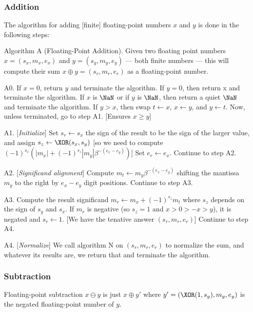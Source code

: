 \subsubsection{Addition}

The algorithm for adding [finite] floating-point numbers $x$ and $y$ is
done in the following steps:

\algbegin Algorithm A (Floating-Point Addition). \label{alg:float-addition}Given two floating
point numbers $x=(s_{x},m_{x},e_{x})$ and $y=(s_{y},m_{y},e_{y})$ ---
both finite numbers --- this
will compute their sum $x\oplus y = (s_{r}, m_{r}, e_{r})$ as a
floating-point number.

\algstep A0.
If $x = 0$, return $y$ and terminate the algorithm.
If $y=0$, then return x and terminate the algorithm.
If $x$ is $\NaN$ or if $y$ is $\NaN$, then return a quiet $\NaN$
and terminate the algorithm.
If $y > x$, then swap $t\gets x$, $x\gets y$, and $y\gets t$.
Now, unless terminated, go to step A1. [Ensures $x\geq y$]

\algstep A1. [{\it Initialize\/}]
Set $s_{r}\gets s_{x}$ the sign of the
result to be the sign of the larger value, and assign $s_{z} \gets \XOR(s_{x},s_{y})$
[so we need to compute $(-1)^{s_{x}}(|m_{x}| + (-1)^{s_{z}}|m_{y}|\beta^{-(e_{x}-e_{y})})$]
Set $e_{r}\gets e_{x}$. Continue to step A2.

\algstep A2. [{\it Significand alignment\/}] Compute $m_{t}\gets m_{y}\beta^{-(e_{x}-e_{y})}$
shifting the mantissa $m_{y}$ to the right by $e_{x}-e_{y}$ digit
positions. Continue to step A3.

\algstep A3. Compute the result significand $m_{r}\gets m_{x} + (-1)^{s_{z}}m_{t}$
where $s_{z}$ depends on the sign of $s_{y}$ and $s_{x}$. If $m_{r}$
is negative (so $s_{z}=1$ and $x>0>-x>y$), it is negated and $s_{r}\gets 1$.
[We have the tenative answer $(s_{r}, m_{r}, e_{r})$] Continue to step A4.

\algstep A4. [{\it Normalize\/}] We call algorithm N on $(s_{r}, m_{r}, e_{r})$
to normalize the sum, and whatever its results are, we return that and
terminate the algorithm.\quad\slug


\subsubsection{Subtraction}

\begin{rmk}[Subtraction]
  Floating-point subtraction $x\ominus y$ is just $x\oplus y'$ where
  $y' = (\XOR(1,s_{y}),m_{y},e_{y})$ is the negated floating-point
  number of $y$.
\end{rmk}

